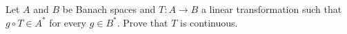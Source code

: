 Let $A$ and $B$ be Banach spaces and $T: A \to B$ a linear transformation such that $g \circ T \in A^*$ for every $g \in B^*$. Prove that $T$ is continuous.

